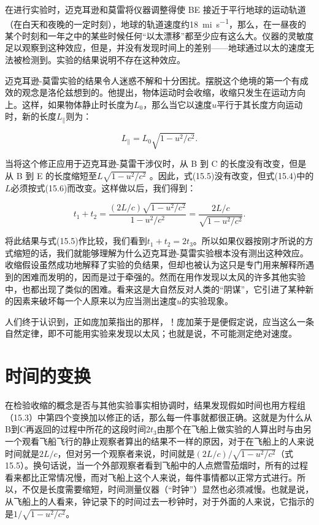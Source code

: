 \documentclass[12pt,oneside]{book}
\begin{document}
在进行实验时，迈克耳逊和莫雷将仪器调整得使 BE 接近于平行地球的运动轨道（在白天和夜晚的一定时刻），地球的轨道速度约\qty{18}{mi.s^{-1}}，那么，在一昼夜的某个时刻和一年之中的某些时候任何“以太漂移”都至少应有这么大。仪器的灵敏度足以观察到这种效应，但是，并没有发现时间上的差别——地球通过以太的速度无法被检测到。实验的结果说明不存在这种效应。


迈克耳逊-莫雷实验的结果令人迷惑不解和十分困扰。摆脱这个绝境的第一个有成效的观念是洛伦兹想到的。他提出，物体运动时会收缩，收缩只发生在运动方向上。这样，如果物体静止时长度为$L_0$，那么当它以速度$u$平行于其长度方向运动时，新的长度$L_{\parallel}$则为：


\begin{equation}
\label{Eq:I:15:6}
L_\parallel=L_0\sqrt{1-u^2/c^2}.
\end{equation}

当将这个修正应用于迈克耳逊-莫雷干涉仪时，从 B 到 C 的长度没有改变，但是从 B 到 E 的长度缩短至$L\sqrt{1 - u^2/c^2}$ 。因此，式(15.5)没有改变，但式(15.4)中的$L$必须按式(15.6)而改变。这样做以后，我们得到：


\begin{equation}
\label{Eq:I:15:7}
t_1+t_2=\frac{(2L/c)\sqrt{1-u^2/c^2}}{1-u^2/c^2}=
\frac{2L/c}{\sqrt{1-u^2/c^2}}.
\end{equation}

将此结果与式(15.5)作比较，我们看到$t_1 + t_2 = 2t_3$。所以如果仪器按刚才所说的方式缩短的话，我们就能够理解为什么迈克耳逊-莫雷实验根本没有测出这种效应。收缩假设虽然成功地解释了实验的负结果，但却也被认为这只是专门用来解释所遇到的困难而发明的，因而是过于牵强的。然而在用作发现以太风的许多其他实验中，也都出现了类似的困难。看来这是大自然反对人类的“阴谋”，它引进了某种新的因素来破坏每一个人原来以为应当测出速度$u$的实验现象。


人们终于认识到，正如庞加莱指出的那样，！庞加莱于是便假定说，应当这么一条自然定律，即不可能用实验来发现以太风；也就是说，不可能测定绝对速度。



\section{时间的变换}
在检验收缩的概念是否与其他实验事实相协调时，结果发现假如时间也用方程组（15.3）中第四个变换加以修正的话，那么每一件事就都很正确。这就是为什么从B到C再返回的过程中所花的这段时间$ 2t_3 $由那个在飞船上做实验的人算出时与由另一个观看飞船飞行的静止观察者算出的结果不一样的原因，对于在飞船上的人来说时间就是$ 2L/c $，但对另一个观察者来说，时间就是$ (2L/c)/\sqrt{ 1 - u^2/c^2} $（式15.5）。换句话说，当一个外部观察者看到飞船中的人点燃雪茄烟时，所有的过程看来都比正常情况慢，而对飞船上这个人来说，每件事情都以正常方式进行。所以，不仅是长度需要缩短，时间测量仪器（“时钟”）显然也必须减慢。也就是说，从飞船上的人看来，钟记录下的时间过去一秒钟时，对于外面的人来说，它指示的是$  1/\sqrt{1 - u^2/c^2}$。
\end{document}
